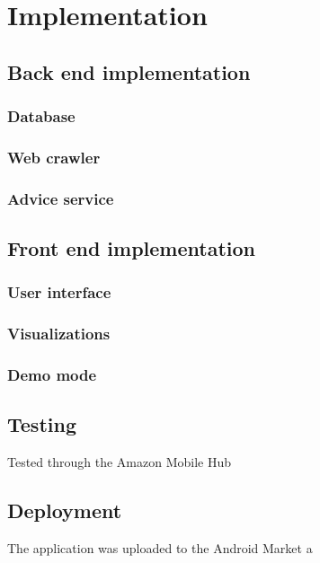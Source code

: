 \chapter{Implementation}
\section{Back end implementation}
\subsection{Database}
\subsection{Web crawler}
\subsection{Advice service}

\section{Front end implementation}
\subsection{User interface}
\subsection{Visualizations}
\subsection{Demo mode}

\section{Testing}
Tested through the Amazon Mobile Hub

\section{Deployment}
The application was uploaded to the Android Market a